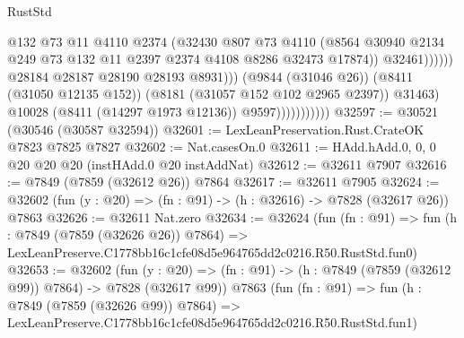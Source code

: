 \begin{lexlean}{RustStd}
\begin{coremodule}
                                              @132
                                              @73
                                              @11
                                              @4110
                                              @2374
                                              (@32430
                                                @807
                                                @73
                                                @4110
                                                (@8564
                                                  @30940
                                                  @2134
                                                  @249
                                                  @73
                                                  @132
                                                  @11
                                                  @2397
                                                  @2374
                                                  @4108
                                                  @8286
                                                  @32473
                                                  @17874))
                                              @32461))))))
                                  @28184
                                  @28187
                                  @28190
                                  @28193
                                  @8931)))
                            (@9844 (@31046 @26))
                            (@8411 (@31050 @12135 @152))
                            (@8181 (@31057 @152 @102 @2965 @2397))
                            @31463)
                          @10028
                          (@8411 (@14297 @1973 @12136))
                          @9597)))))))))))
@32597 := @30521 (@30546 (@30587 @32594))
@32601 := LexLeanPreservation.Rust.CrateOK @7823 @7825 @7827
@32602 := Nat.casesOn.{0}
@32611 := HAdd.hAdd.{0, 0, 0} @20 @20 @20 (instHAdd.{0} @20 instAddNat)
@32612 := @32611 @7907
@32616 := @7849 (@7859 (@32612 @26)) @7864
@32617 := @32611 @7905
@32624 := @32602 (fun (y : @20) => (fn : @91) -> (h : @32616) -> @7828 (@32617 @26)) @7863
@32626 := @32611 Nat.zero
@32634 := @32624
    (fun (fn : @91) =>
    fun (h : @7849 (@7859 (@32626 @26)) @7864) =>
    LexLeanPreserve.C1778bb16c1cfe08d5e964765dd2c0216.R50.RustStd.fun0)
@32653 := @32602
    (fun (y : @20) => (fn : @91) -> (h : @7849 (@7859 (@32612 @99)) @7864) -> @7828 (@32617 @99))
    @7863
    (fun (fn : @91) =>
    fun (h : @7849 (@7859 (@32626 @99)) @7864) =>
    LexLeanPreserve.C1778bb16c1cfe08d5e964765dd2c0216.R50.RustStd.fun1)

\end{coremodule}
\end{lexlean}
